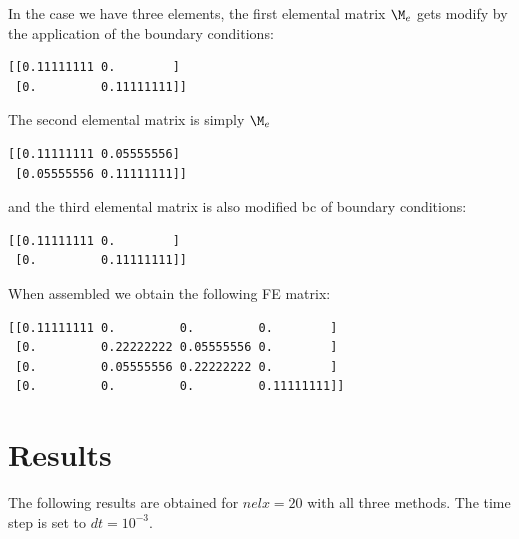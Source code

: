 In the case we have three elements, the first elemental matrix $\M_e$
gets modify by the application of the boundary conditions:
\begin{verbatim}
[[0.11111111 0.        ]
 [0.         0.11111111]]
\end{verbatim}
The second elemental matrix is simply $\M_e$
\begin{verbatim}
[[0.11111111 0.05555556]
 [0.05555556 0.11111111]]
\end{verbatim}
and the third elemental matrix is also modified bc of boundary conditions:
\begin{verbatim}
[[0.11111111 0.        ]
 [0.         0.11111111]]
\end{verbatim}
When assembled we obtain the following FE matrix:
\begin{verbatim}
[[0.11111111 0.         0.         0.        ]
 [0.         0.22222222 0.05555556 0.        ]
 [0.         0.05555556 0.22222222 0.        ]
 [0.         0.         0.         0.11111111]]
\end{verbatim}



\section*{Results}


The following results are obtained for $nelx=20$ with all three methods.
The time step is set to $dt=10^{-3}$. 

